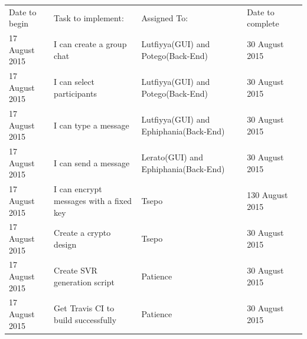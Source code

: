 \documentclass[a4paper]{article}
\begin{document}
\setlength{\arrayrulewidth}{0.5mm}
\setlength{\tabcolsep}{12pt}
\renewcommand{\arraystretch}{2} 
\begin{tabular}{ |p{3cm}|p{3cm}|p{3cm}|p{3cm}|p{3cm}|  }
\hline
\rowcolor{lightgray}\multicolumn{4}{|c|}{Work to Complete} \\
\hline 
Date to begin & Task to implement: & Assigned To: & Date to complete\\
\hline
17 August 2015 & I can create a group chat & Lutfiyya(GUI) and  Potego(Back-End) & 30 August 2015\\ 
\hline
17 August 2015 & I can select participants & Lutfiyya(GUI) and Potego(Back-End) & 30 August 2015\\ 
\hline
17 August 2015 & I can type a message & Lutfiyya(GUI) and Ephiphania(Back-End) & 30 August 2015\\ 
\hline
17 August 2015 & I can send a message & Lerato(GUI) and Ephiphania(Back-End) & 30 August 2015\\ 
\hline
17 August 2015 & I can encrypt messages with a fixed key & Tsepo  & 130 August 2015\\ 
\hline
17 August 2015 & Create a crypto design & Tsepo  & 30 August 2015\\ 
\hline

17 August 2015 & Create SVR generation script & Patience & 30 August 2015\\ 
\hline
17 August 2015 & Get Travis CI to build successfully & Patience & 30 August 2015\\ 
\hline

\end{tabular}
\end{document}
